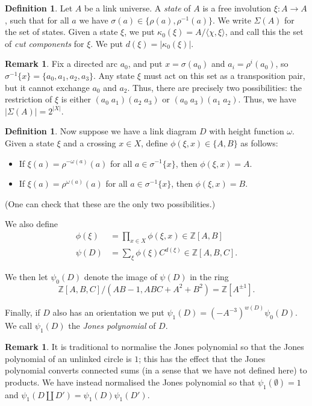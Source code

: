 \documentclass{amsart}
\newcommand{\Z}         {{\mathbb{Z}}}
\newcommand{\Sg}        {\Sigma}
\newcommand{\kp}        {\kappa}
\newcommand{\om}        {\omega}
\newcommand{\sg}        {\sigma}
\newcommand{\ip}[1]     {\langle #1\rangle}
\renewcommand{\:}{\colon}
\theoremstyle{definition}
\newtheorem{remark}[theorem]{Remark}
\newtheorem{definition}[theorem]{Definition}
\begin{document}
\begin{definition}
 Let $A$ be a link universe.  A \emph{state} of $A$ is a free
 involution $\xi\:A\to A$, such that for all $a$ we have
 $\sg(a)\in\{\rho(a),\rho^{-1}(a)\}$.  We write $\Sg(A)$ for the set
 of states.  Given a state $\xi$, we put $\kp_0(\xi)=A/\ip{\chi,\xi}$,
 and call this the set of \emph{cut components} for $\xi$.  We put
 $d(\xi)=|\kp_0(\xi)|$.
\end{definition}

\begin{remark}
 Fix a directed arc $a_0$, and put $x=\sg(a_0)$ and $a_i=\rho^i(a_0)$,
 so $\sg^{-1}\{x\}=\{a_0,a_1,a_2,a_3\}$.  Any state $\xi$ must act on
 this set as a transposition pair, but it cannot exchange $a_0$ and
 $a_2$.  Thus, there are precisely two possibilities: the restriction
 of $\xi$ is either $(a_0\;a_1)(a_2\;a_3)$ or $(a_0\;a_3)(a_1\;a_2)$.
 Thus, we have $|\Sg(A)|=2^{|X|}$.
\end{remark}

\begin{definition}
 Now suppose we have a link diagram $D$ with height function $\om$.
 Given a state $\xi$ and a crossing $x\in X$, define
 $\phi(\xi,x)\in\{A,B\}$ as follows: 
 \begin{itemize}
  \item If $\xi(a)=\rho^{-\om(a)}(a)$ for all $a\in\sg^{-1}\{x\}$,
   then $\phi(\xi,x)=A$.
  \item If $\xi(a)=\rho^{\om(a)}(a)$ for all $a\in\sg^{-1}\{x\}$,
   then $\phi(\xi,x)=B$.
 \end{itemize}
 (One can check that these are the only two possibilities.)

 We also define 
 \begin{align*}
  \phi(\xi) &= \prod_{x\in X}\phi(\xi,x)\in\Z[A,B] \\
  \psi(D) &= \sum_{\xi} \phi(\xi) C^{d(\xi)}\in\Z[A,B,C].
 \end{align*}

 We then let $\psi_0(D)$ denote the image of $\psi(D)$ in the ring 
 \[ \Z[A,B,C]/(AB-1,ABC+A^2+B^2) = \Z[A^{\pm 1}]. \]

 Finally, if $D$ also has an orientation we put
 $\psi_1(D)=(-A^{-3})^{w(D)}\psi_0(D)$.  We call $\psi_1(D)$ the
 \emph{Jones polynomial} of $D$.  
\end{definition}

\begin{remark}
 It is traditional to normalise the Jones polynomial so that the Jones
 polynomial of an unlinked circle is $1$; this has the effect that the
 Jones polynomial converts connected sums (in a sense that we have
 not defined here) to products.  We have instead normalised the Jones
 polynomial so that $\psi_1(\emptyset)=1$ and
 $\psi_1(D\amalg D')=\psi_1(D)\psi_1(D')$.
\end{remark}
\end{document}
